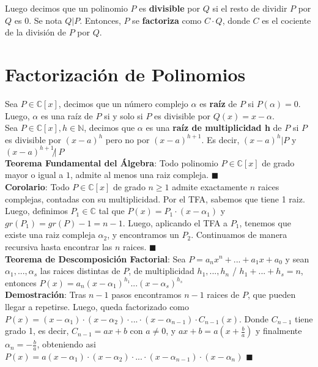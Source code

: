 \documentclass[11pt,a4paper]{article}
\newcommand*{\QEDA}{\null\nobreak\hfill\ensuremath{\blacksquare}}
\begin{document}
\noindent Luego decimos que un polinomio $P$ es \textbf{divisible} por $Q$ si el resto de dividir $P$ por $Q$ es 0. Se nota $Q|P$. Entonces, $P$ se \textbf{factoriza} como $C \cdot Q$, donde $C$ es el cociente de la divisi\'on de $P$ por $Q$.

\section{Factorizaci\'on de Polinomios}
\noindent Sea $P\in\mathbb{C}[x]$, decimos que un n\'umero complejo $\alpha$ es \textbf{ra\'iz} de $P$ si $P(\alpha) = 0$. Luego, $\alpha$ es una ra\'iz de $P$ si y solo si $P$ es divisible por $Q(x) = x-\alpha$.\\

\noindent Sea $P\in\mathbb{C}[x], h \in \mathbb{N}$, decimos que $\alpha$ es una \textbf{ra\'iz de multiplicidad h} de $P$ si $P$ es divisible por $(x-a)^h$ pero no por $(x-a)^{h+1}$. Es decir, $(x-a)^h | P$ y $(x-a)^{h+1} \not |\ P$\\

\noindent \textbf{Teorema Fundamental del \'Algebra}: Todo polinomio $P \in \mathbb{C}[x]$ de grado mayor o igual a $1$, admite al menos una raiz compleja. \QEDA\\
\noindent \textbf{Corolario}: Todo $P\in\mathbb{C}[x]$ de grado $n\geq 1$ admite exactamente $n$ raices complejas, contadas con su multiplicidad. Por el TFA, sabemos que tiene 1 raiz. Luego, definimos $P_1 \in \mathbb{C}$ tal que $P(x) = P_1 \cdot (x-\alpha_1)$ y $gr(P_1) = gr(P) - 1 = n-1$. Luego, aplicando el TFA a $P_1$, tenemos que existe una raiz compleja $\alpha_2$, y encontramos un $P_2$. Continuamos de manera recursiva hasta encontrar las $n$ raices. \QEDA\\

\noindent \textbf{Teorema de Descomposici\'on Factorial}: Sea $P = a_nx^n + ... + a_1x + a_0$ y sean $\alpha_1,...,\alpha_s$ las raices distintas de $P$, de multiplicidad $h_1,...,h_n$ / $h_1+...+h_s=n$, entonces $P(x) = a_n(x-\alpha_1)^{h_1} ... (x-\alpha_s)^{h_s}$\\
\textbf{Demostraci\'on}: Tras $n-1$ pasos encontramos $n-1$ raices de $P$, que pueden llegar a repetirse. Luego, queda factorizado como $P(x)=(x-\alpha_1)\cdot (x-\alpha_2)\cdot ...\cdot (x-\alpha_{n-1})\cdot C_{n-1}(x)$. Donde $C_{n-1}$ tiene grado 1, es decir, $C_{n-1} = ax+b$ con $a\not=0$, y $ax+b = a\left(x + \frac{b}{a}\right)$ y finalmente $\alpha_n = -\frac{b}{a}$, obteniendo asi $P(x)=a(x-\alpha_1)\cdot (x-\alpha_2)\cdot ...\cdot (x-\alpha_{n-1})\cdot (x-\alpha_n)$ \QEDA\\
\end{document}
